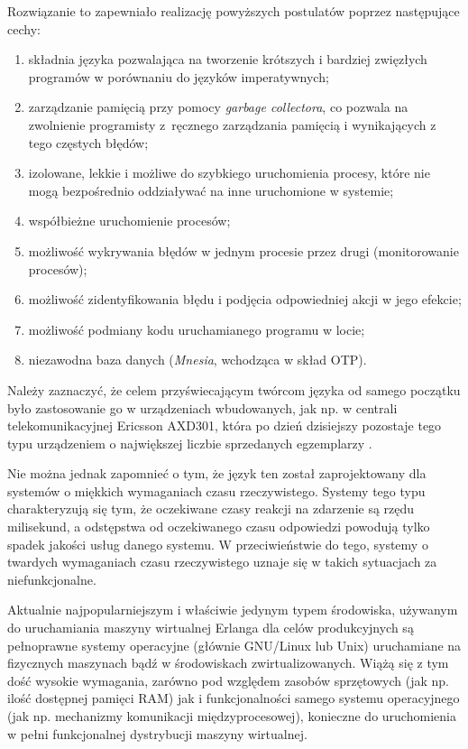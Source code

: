 Rozwiązanie to zapewniało realizację powyższych postulatów poprzez następujące cechy:
\begin{enumerate}
\item składnia języka pozwalająca na tworzenie krótszych i bardziej zwięzłych programów w porównaniu do języków imperatywnych;
\item zarządzanie pamięcią przy pomocy \emph{garbage collectora}, co pozwala na zwolnienie programisty z~ręcznego zarządzania pamięcią i wynikających z tego częstych błędów;
\item izolowane, lekkie i możliwe do szybkiego uruchomienia procesy, które nie mogą bezpośrednio oddziaływać na inne uruchomione w systemie;
\item współbieżne uruchomienie procesów;
\item możliwość wykrywania błędów w jednym procesie przez drugi (monitorowanie procesów);
\item możliwość zidentyfikowania błędu i podjęcia odpowiedniej akcji w jego efekcie;
\item możliwość podmiany kodu uruchamianego programu w locie;
\item niezawodna baza danych (\emph{Mnesia}, wchodząca w skład OTP).
\end{enumerate}

Należy zaznaczyć, że celem przyświecającym twórcom języka od samego początku było zastosowanie go w urządzeniach wbudowanych, jak np. w centrali telekomunikacyjnej Ericsson AXD301, która po dzień dzisiejszy pozostaje tego typu urządzeniem o największej liczbie sprzedanych egzemplarzy \cite{armstrong2003making}.

Nie można jednak zapomnieć o tym, że język ten został zaprojektowany dla systemów o miękkich wymaganiach czasu rzeczywistego. Systemy tego typu charakteryzują się tym, że oczekiwane czasy reakcji na zdarzenie są rzędu milisekund, a odstępstwa od oczekiwanego czasu odpowiedzi powodują tylko spadek jakości usług danego systemu. W przeciwieństwie do tego, systemy o twardych wymaganiach czasu rzeczywistego uznaje się w takich sytuacjach za niefunkcjonalne.

Aktualnie najpopularniejszym i właściwie jedynym typem środowiska, używanym do uruchamiania maszyny wirtualnej Erlanga dla celów produkcyjnych są pełnoprawne systemy operacyjne (głównie GNU/Linux lub Unix) uruchamiane na fizycznych maszynach bądź w środowiskach zwirtualizowanych. Wiążą się z tym dość wysokie wymagania, zarówno pod względem zasobów sprzętowych (jak np. ilość dostępnej pamięci RAM) jak i funkcjonalności samego systemu operacyjnego (jak np. mechanizmy komunikacji międzyprocesowej), konieczne do uruchomienia w pełni funkcjonalnej dystrybucji maszyny wirtualnej.

